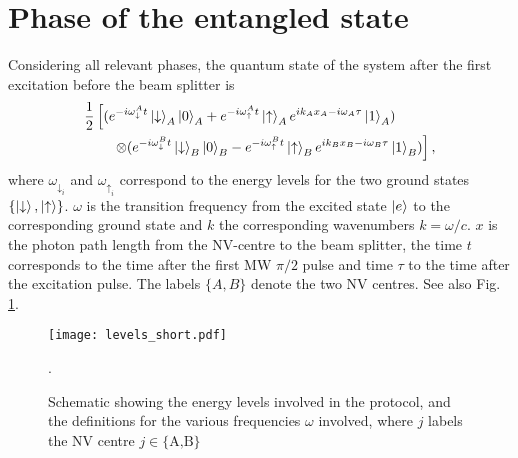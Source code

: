 \section{Phase of the entangled state}
\label{sec:phases}
Considering all relevant phases, the quantum state of the system after the first excitation before the beam splitter is
\begin{align}
&\frac{1}{2} \left[ (e^{-i \omega_{\downarrow}^A t}\left|\downarrow\right>_A\left|0\right>_A + e^{-i \omega_{\uparrow}^A t}\left|\uparrow\right>_A e^{i k_A x_A -i \omega_A \tau}\left|1\right>_A)\right.\\ \nonumber
&\left . \qquad \otimes (e^{-i \omega_{\downarrow}^B t}\left|\downarrow\right>_B \left|0\right>_B - e^{-i \omega_{\uparrow}^B t}\left|\uparrow\right>_B e^{i k_B x_B -i \omega_B \tau}\left|1\right>_B)\right],
\end{align}
where $\omega_{\downarrow_i}$ and $\omega_{\uparrow_i}$ correspond to the energy levels for the two ground states $\{\left|\downarrow\right>,\left|\uparrow\right>\}$. $\omega$ is  the transition frequency from the excited state $\left|e\right>$ to the corresponding ground state and $k$ the corresponding wavenumbers $k=\omega/c$. $x$ is the photon path length from the NV-centre to the beam splitter, the time $t$ corresponds to the time after the first MW $\pi/2$ pulse and time $\tau$ to the time after the excitation pulse. The labels $\{A,B\}$ denote the two NV centres. See also Fig.\,\ref{fig:levels}.

\begin{figure}[h]
\centering
\texttt{[image: levels\_short.pdf]}
\caption{Schematic showing the energy levels involved in the protocol, and the definitions for the various frequencies $\omega$ involved, where $j$ labels the NV centre $j\in \{\text{A,B}\}$}.
\label{fig:levels}
\end{figure}

